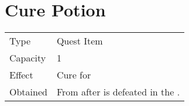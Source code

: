 \section{Cure Potion}
\label{item:cure_potion_uniq}


\noindent\begin{tabularx}{\textwidth}[l]{lX}
	Type
	& Quest Item
\\ %
	Capacity
	& 1
\\ %
	Effect
	& Cure for \nameref{char:kaeli}
\\ %
	Obtained
	& From \nameref{char:tristam} after \nameref{monster:flamerus_rex} is defeated in the \nameref{map:bone_dungeon}.
\end{tabularx}
